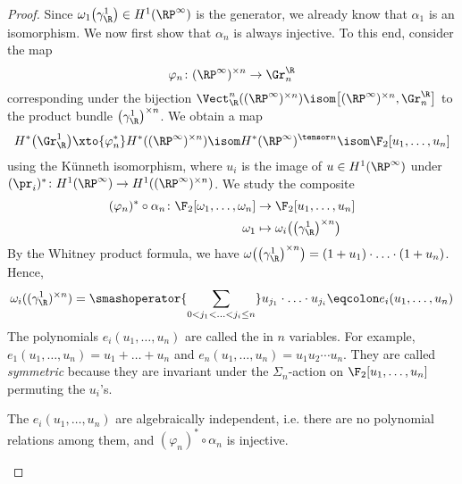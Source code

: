 \begin{proof}
	Since $\omega_1\big(\gamma_\R^1\big) \in H^1(\RP^\infty)$ is the generator, we already know that $\alpha_1$ is an isomorphism.
	We now first show that $\alpha_n$ is always injective.
	To this end, consider the map
	\begin{equation*}
		\varphi_n\colon (\RP^\infty)^{\times n} \to \Gr_n^\R
	\end{equation*}
	corresponding under the bijection $\Vect_\R^n((\RP^\infty)^{\times n}) \isom \big[(\RP^\infty)^{\times n}, \Gr_n^\R\big]$ to the product bundle $\big(\gamma_\R^1\big)^{\times n}$.
	We obtain a map 
	\begin{equation*}
		H^*\big(\Gr_\R^1\big) \xto{\varphi_n^*} H^*((\RP^\infty)^{\times n}) \isom H^*(\RP^\infty)^{\tensor n} \isom \F_2[u_1, \ldots, u_n]
	\end{equation*}
	using the Künneth isomorphism, where $u_i$ is the image of $u \in H^1(\RP^\infty)$ under $(\pr_i)^*\colon H^1(\RP^\infty) \to H^1((\RP^\infty)^{\times n})$.
	We study the composite 
	\begin{align*}
		(\varphi_n)^* \circ \alpha_n\colon \F_2[\omega_1, \ldots, \omega_n] &\to \F_2[u_1, \ldots, u_n] \\
		\omega_1 &\mapsto \omega_i\big(\big(\gamma_\R^1\big)^{\times n}\big)
	\end{align*}
	By the Whitney product formula, we have $\omega\big(\big(\gamma_\R^1\big)^{\times n}\big) = (1 + u_1) \cdot \ldots \cdot (1 + u_n)$.
	Hence, 
	\begin{equation*}
		\omega_i((\gamma_\R^1)^{\times n}) = \smashoperator{\sum_{0 < j_1 < \ldots < j_i \leq n}} u_{j_1} \cdot \ldots \cdot u_{j_i} \eqcolon e_i(u_1, \ldots, u_n)
	\end{equation*}
	The polynomials $e_i(u_1, \ldots, u_n)$ are called the  in $n$ variables.
	For example, $e_1(u_1, \ldots, u_n) = u_1 + \ldots + u_n$ and $e_n(u_1, \ldots, u_n) = u_1 u_2 \cdots u_n$.
	They are called \emph{symmetric} because they are invariant under the $\Sigma_n$-action on $\F_2[u_1, \ldots, u_n]$ permuting the $u_i$'s.
	\begin{proposition}
		The $e_i(u_1, \ldots, u_n)$ are algebraically independent, i.e. there are no polynomial relations among them, and $(\varphi_n)^* \circ \alpha_n$ is injective.
	\end{proposition}
	\begin{smallproof}

\end{smallproof}
\end{proof}
